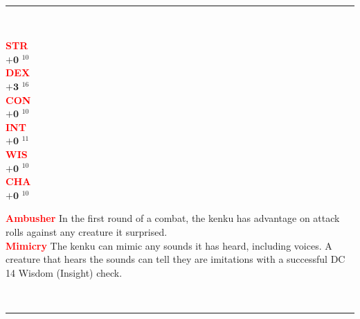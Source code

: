 \documentclass{article}
\begin{document}
\begin{adjustbox}{minipage=0.45\textwidth, margin=\fboxsep, bgimage=../images/texture2.pdf}
{\begin{minipage}[t][10.5in][t]{0.9\textwidth}
\begin{minipage}[t]{0.7\textwidth}
        \end{minipage}
        \vspace{0.025in}\\
        \rule{\textwidth}{1pt}\\
        \vspace{0.025in}
        \begin{minipage}[t]{0.2\textwidth}
            {\large
            \textcolor{red}{\textbf{STR}}\\[0.1em]
            $\mathbf{+0}$\,\,$^{10}$ \\[0.1em]
            \textcolor{red}{\textbf{DEX}}\\[0.1em]
            $\mathbf{+3}$\,\,$^{16}$ \\[0.1em]
            \textcolor{red}{\textbf{CON}}\\[0.1em]
            $\mathbf{+0}$\,\,$^{10}$ \\[0.1em]
            \textcolor{red}{\textbf{INT}}\\[0.1em]
            $\mathbf{+0}$\,\,$^{11}$ \\[0.1em]
            \textcolor{red}{\textbf{WIS}}\\[0.1em]
            $\mathbf{+0}$\,\,$^{10}$ \\[0.1em]
            \textcolor{red}{\textbf{CHA}}\\[0.1em]
            $\mathbf{+0}$\,\,$^{10}$ \\[0.1em]
            }
        \end{minipage}
        \hspace{-0.1in}
        \vline
        \hspace{0.1in}
        \begin{minipage}[t]{0.7\textwidth}
            \textcolor{red}{\textbf{Ambusher}}  In the first round of a combat, the kenku has advantage on attack rolls against any creature it surprised. \\[0.2em]
            \textcolor{red}{\textbf{Mimicry}} The kenku can mimic any sounds it has heard, including voices. A creature that hears the sounds can tell they are imitations with a successful DC 14 Wisdom (Insight) check.
        \end{minipage}
        \vspace{0.025in}\\
        \rule{\textwidth}{1pt}\\
        \vspace{-0.08in}
        \begin{flushleft}

\end{flushleft}
\end{minipage}}
\end{adjustbox}
\end{document}
